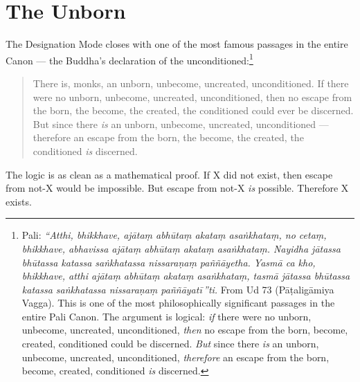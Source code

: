 \section*{The Unborn}

The Designation Mode closes with one of the most famous passages in the entire Canon --- the Buddha's declaration of the unconditioned:\footnote{Pali: \textit{``Atthi, bhikkhave, ajātaṃ abhūtaṃ akataṃ asaṅkhataṃ, no cetaṃ, bhikkhave, abhavissa ajātaṃ abhūtaṃ akataṃ asaṅkhataṃ. Nayidha jātassa bhūtassa katassa saṅkhatassa nissaraṇaṃ paññāyetha. Yasmā ca kho, bhikkhave, atthi ajātaṃ abhūtaṃ akataṃ asaṅkhataṃ, tasmā jātassa bhūtassa katassa saṅkhatassa nissaraṇaṃ paññāyatī\,''ti.} From Ud 73 (Pāṭaligāmiya Vagga). This is one of the most philosophically significant passages in the entire Pali Canon. The argument is logical: \textit{if} there were no unborn, unbecome, uncreated, unconditioned, \textit{then} no escape from the born, become, created, conditioned could be discerned. \textit{But} since there \textit{is} an unborn, unbecome, uncreated, unconditioned, \textit{therefore} an escape from the born, become, created, conditioned \textit{is} discerned.}

\begin{quote}
There is, monks, an unborn, unbecome, uncreated, unconditioned. If there were no unborn, unbecome, uncreated, unconditioned, then no escape from the born, the become, the created, the conditioned could ever be discerned. But since there \textit{is} an unborn, unbecome, uncreated, unconditioned --- therefore an escape from the born, the become, the created, the conditioned \textit{is} discerned.
\end{quote}

The logic is as clean as a mathematical proof. If X did not exist, then escape from not-X would be impossible. But escape from not-X \textit{is} possible. Therefore X exists.

